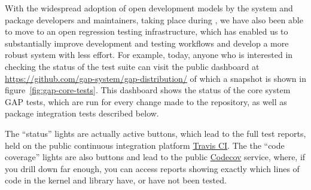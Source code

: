 
%
%

With the widespread adoption of open development models by the
\GAP system and package developers and
maintainers, taking place during \ODK, we have also been able to move
to an open regression testing infrastructure, which has enabled us
to substantially improve \GAP development and testing workflows and
develop a more robust system with less effort. For example,
today, anyone who is interested in checking the
status of the \GAP test suite can visit the public dashboard at
\url{https://github.com/gap-system/gap-distribution/} of which a
snapshot is shown in figure~\ref{fig:gap-core-tests}.
This dashboard shows the status of the core system GAP tests,
which are run for every change made to the repository, as well as
package integration tests described below.

The ``status'' lights are actually active buttons, which lead to the
full test reports, held on the public continuous integration platform
\href{https://travis-ci.org/}{Travis CI}. The the ``code coverage''
lights are also buttons and lead to the public
\href{https://codecov.io/}{Codecov} service, where, if you drill down far
enough, you can access reports showing exactly which lines of code in the kernel
and library have, or have not been tested.


